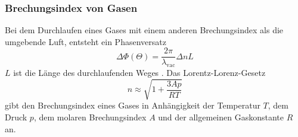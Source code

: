 \subsubsection{Brechungsindex von Gasen}
Bei dem Durchlaufen eines Gases mit einem anderen Brechungsindex als die umgebende Luft,
entsteht ein Phasenversatz
\begin{equation}
\Delta \Phi(\Theta)=\frac{2\pi}{\lambda_{\text{vac}}} \Delta n L
\label{eq:pM2}
\end{equation}
$L$ ist die Länge des durchlaufenden Weges \cite{V64}.
\newline \newline
\noindent Das Lorentz-Lorenz-Gesetz
\begin{equation}
  n \approx \sqrt{1+ \frac{3Ap}{RT}}
  \label{eqn:lorentz}
\end{equation}
gibt den Brechungsindex eines Gases in Anhängigkeit der Temperatur $T$,
dem Druck $p$, dem molaren Brechungsindex $A$ 
und der allgemeinen Gaskonstante $R$ an.